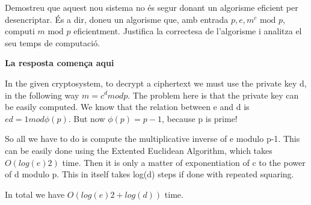 \documentclass[a4paper,10pt]{article}
\begin{document}
\begin{enumerate}
 Demostreu que aquest nou sistema no és segur donant un algorisme eficient per desencriptar. És a dir, doneu un algorisme que, amb entrada $p,e,m^c \textrm{ mod } p$, computi $m \textrm{ mod } p$ eficientment. Justifica la correctesa de l'algorisme i analitza el seu temps de computació.
 
 \textbf{La resposta comença aqui}
 
 In the given cryptosystem, to decrypt a ciphertext we must use the private key d, in the following way $m = c^d mod p$. The problem here is that the private key can be easily computed. We know that the relation between e and d is $ed = 1 mod \phi(p)$.
But now $\phi(p)=p-1$, because p is prime! 

So all we have to do is compute the multiplicative inverse of e modulo p-1. This can be easily done using the Extented Euclidean Algorithm, which takes $O(log(e)2)$ time. Then it is only a matter of exponentiation of c to the power of d modulo p. This in itself takes log(d) steps if done with repeated squaring. 

In total we have $O(log(e)2+log(d))$ time.
\end{enumerate}
\end{document}
